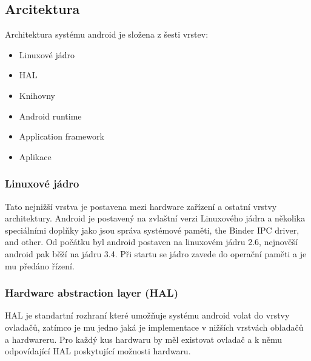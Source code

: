 \subsection{Arcitektura}
Architektura systému android je složena z šesti vrstev:
\begin{itemize}
\item Linuxové jádro
\item HAL
\item Knihovny
\item Android runtime
\item Application framework
\item Aplikace
\end{itemize}
\subsubsection{Linuxové jádro} %
Tato nejnižší vrstva je postavena mezi hardware zařízení a ostatní vrstvy architektury. Android je postavený na zvlaštní verzi Linuxového jádra a několika speciálními doplňky jako jsou správa systémové paměti, the Binder IPC driver, and other. Od počátku byl android postaven na linuxovém jádru 2.6, nejnověší android pak běží na jádru 3.4.  Při startu se jádro zavede do operační paměti a je mu předáno řízení.
\subsubsection{Hardware abstraction layer (HAL)} %
HAL je standartní rozhraní které umožňuje systému android volat do vrstvy ovladačů, zatímco je mu jedno jaká je implementace v nižších vrstvách obladačů a hardwareru. Pro každý kus hardwaru by měl existovat ovladač a k němu odpovídající HAL poskytující možnosti hardwaru.
